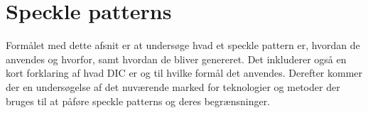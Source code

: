 \section{Speckle patterns} 
Formålet med dette afsnit er at undersøge hvad et speckle pattern er, hvordan de anvendes og hvorfor, samt hvordan de bliver genereret. Det inkluderer også en kort forklaring af hvad DIC er og til hvilke formål det anvendes. Derefter kommer der en undersøgelse af det nuværende marked for teknologier og metoder der bruges til at påføre speckle patterns og deres begrænsninger.

